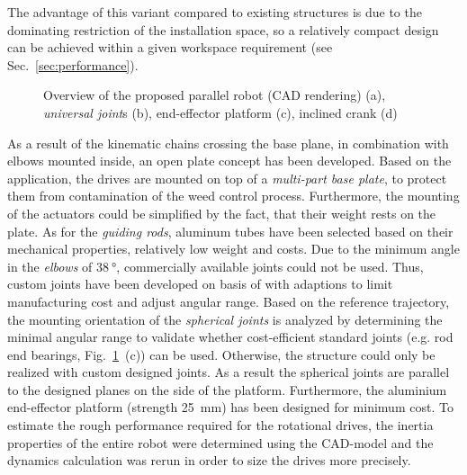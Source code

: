 \documentclass[runningheads,hidelinks]{llncs}
\begin{document}
The advantage of this variant compared to existing structures is due to the dominating restriction of the installation space, so a relatively compact design can be achieved within a given workspace requirement (see Sec.~\ref{sec:performance}). 
%
%
%
%
%
%
%
%
%
%
%
\begin{figure}[tb]
	\centering
	\def\svgwidth{1\columnwidth}
	
	\caption{Overview of the proposed parallel robot (CAD rendering) (a), \emph{universal joint}s (b), end-effector platform (c), inclined crank (d)}
	\label{fig:design}
\end{figure}
As a result of the kinematic chains crossing the base plane, in combination with elbows mounted inside, an open plate concept has been developed.
Based on the application, the drives are mounted on top of a \emph{multi-part base plate}, to protect them from contamination of the weed control process.
Furthermore, the mounting of the actuators could be simplified by the fact, that their weight rests on the plate.
As for the \emph{guiding rods}, aluminum tubes have been selected based on their mechanical properties, relatively low weight and costs.
Due to the minimum angle in the \emph{elbows} of $\SI{38}{\degree}$, commercially available joints could not be used. 
Thus, custom joints have been developed on basis of \cite{Otremba.2005} with adaptions to limit manufacturing cost and adjust angular range.
Based on the reference trajectory, the mounting orientation of the \emph{spherical joints} is analyzed by determining the minimal angular range to validate whether cost-efficient standard joints (e.g. rod end bearings, Fig.~\ref{fig:design}~(c)) can be used.
Otherwise, the structure could only be realized with custom designed joints.
As a result the spherical joints are parallel to the designed planes on the side of the platform.
Furthermore, the aluminium end-effector platform (strength \SI{25}{\milli\metre}) has been designed for minimum cost. 
To estimate the rough performance required for the rotational drives, the inertia properties of the entire robot were determined using the CAD-model and the dynamics calculation was rerun in order to size the drives more precisely. 
\end{document}
